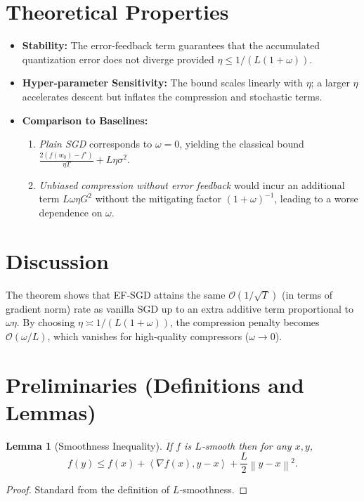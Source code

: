 \documentclass{article}
\newtheorem{lemma}{Lemma}
\newcommand{\norm}[1]{\left\|#1\right\|}
\newcommand{\inner}[2]{\left\langle #1,#2\right\rangle}
\begin{document}
\section*{Theoretical Properties}
\begin{itemize}
\item \textbf{Stability:} The error‑feedback term guarantees that the accumulated quantization error does not diverge provided $\eta\le 1/(L(1+\omega))$.
\item \textbf{Hyper‑parameter Sensitivity:} The bound scales linearly with $\eta$; a larger $\eta$ accelerates descent but inflates the compression and stochastic terms.
\item \textbf{Comparison to Baselines:}
    \begin{enumerate}[label=\alph*)]
    \item \emph{Plain SGD} corresponds to $\omega=0$, yielding the classical bound $\frac{2(f(w_0)-f^\star)}{\eta T}+L\eta\sigma^{2}$.
    \item \emph{Unbiased compression without error feedback} would incur an additional term $L\omega\eta G^{2}$ without the mitigating factor $(1+\omega)^{-1}$, leading to a worse dependence on $\omega$.
    \end{enumerate}
\end{itemize}

\section*{Discussion}
The theorem shows that EF‑SGD attains the same $\mathcal{O}(1/\sqrt{T})$ (in terms of gradient norm) rate as vanilla SGD up to an extra additive term proportional to $\omega\eta$. By choosing $\eta\asymp 1/(L(1+\omega))$, the compression penalty becomes $\mathcal{O}(\omega/L)$, which vanishes for high‑quality compressors ($\omega\to0$).

\newpage
\section*{Preliminaries (Definitions and Lemmas)}
\begin{lemma}[Smoothness Inequality]\label{lem:smooth}
If $f$ is $L$‑smooth then for any $x,y$,
\[
f(y)\le f(x)+\inner{\nabla f(x)}{y-x}+\frac{L}{2}\norm{y-x}^{2}.
\]
\end{lemma}
\begin{proof}
Standard from the definition of $L$‑smoothness. \qedhere
\end{proof}
\end{document}
